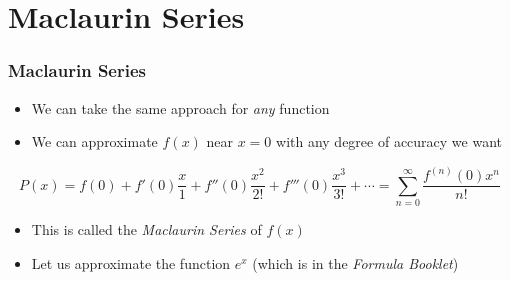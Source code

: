 \documentclass{beamer}
\begin{document}
\section{Maclaurin Series}

\begin{frame}
  \frametitle{Maclaurin Series}
  \begin{itemize}
    \item We can take the same approach for \textit{any} function
    \item We can approximate \( f(x) \) near \( x = 0 \) with any degree of accuracy we want
  \end{itemize}
  \begin{equation*}
    P(x) = f(0) + f'(0)\frac{x}{1} + f''(0)\frac{x^2}{2!} + f'''(0)\frac{x^3}{3!} + \cdots = \sum_{n = 0}^{\infty} \frac{f^{(n)}(0)x^n}{n!}
  \end{equation*}
  \begin{itemize}
    \item This is called the \textit{Maclaurin Series} of \( f(x) \)
    \item Let us approximate the function \( e^x \) (which is in the \textit{Formula Booklet})
  \end{itemize}
\end{frame}

\end{document}
